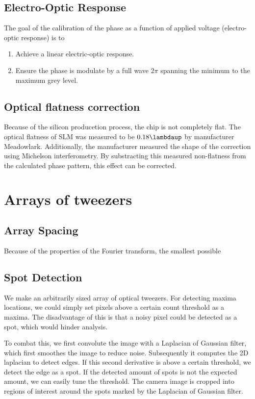 \subsection{Electro-Optic Response}

The goal of the calibration of the phase as a function of applied voltage (electro-optic response) is to 

\begin{enumerate}
    \item Achieve a linear electric-optic response. 
    \item Ensure the phase is modulate by a full wave $2\pi$ spanning the minimum to the maximum grey level. 
\end{enumerate}

\subsection{Optical flatness correction}

Because of the silicon producetion process, the chip is not completely flat. The optical flatness of SLM was measured to be $0.18\lambdaup$ by manufacturer Meadowlark. Additionally, the manufacturer measured the shape of the correction using Michelson interferometry. By substracting this measured non-flatness from the calculated phase pattern, this effect can be corrected. 


\section{Arrays of tweezers}

\subsection{Array Spacing}

Because of the properties of the Fourier transform, the smallest possible 

\subsection{Spot Detection}

We make an arbitrarily sized array of optical tweezers. For detecting maxima locations, we could simply set pixels above a certain count threshold as a maxima. The disadvantage of this is that a noisy pixel could be detected as a spot, which would hinder analysis. 

To combat this, we first convolute the image with a Laplacian of Gaussian filter, which first smoothes the image to reduce noise. Subsequently it computes the 2D laplacian to detect edges. If this second derivative is above a certain threshold, we detect the edge as a spot. If the detected amount of spots is not the expected amount, we can easily tune the threshold. The camera image is cropped into regions of interest around the spots marked by the Laplacian of Gaussian filter. 

